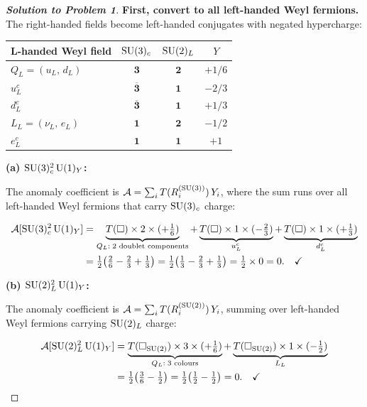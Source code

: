\documentclass[11pt,a4paper]{article}
\begin{document}
\begin{proof}[\textbf{Solution to Problem 1}]

\textbf{First, convert to all left-handed Weyl fermions.}  The right-handed
fields become left-handed conjugates with negated hypercharge:

\begin{center}
\renewcommand{\arraystretch}{1.3}
\begin{tabular}{@{}l c c c@{}}
\toprule
\textbf{L-handed Weyl field} & $\mathrm{SU}(3)_c$ & $\mathrm{SU}(2)_L$ & $Y$ \\
\midrule
$Q_L = (u_L,\, d_L)$ & $\mathbf{3}$ & $\mathbf{2}$ & $+1/6$ \\
$u_L^c$ & $\overline{\mathbf{3}}$ & $\mathbf{1}$ & $-2/3$ \\
$d_L^c$ & $\overline{\mathbf{3}}$ & $\mathbf{1}$ & $+1/3$ \\
$L_L = (\nu_L,\, e_L)$ & $\mathbf{1}$ & $\mathbf{2}$ & $-1/2$ \\
$e_L^c$ & $\mathbf{1}$ & $\mathbf{1}$ & $+1$ \\
\bottomrule
\end{tabular}
\end{center}

\textbf{(a) $\mathrm{SU}(3)_c^2\,\mathrm{U}(1)_Y$:}

The anomaly coefficient is $\mathcal{A} = \sum_i T(R_i^{(\mathrm{SU}(3))})\,Y_i$,
where the sum runs over all left-handed Weyl fermions that carry $\mathrm{SU}(3)_c$
charge:

\begin{align}
  \mathcal{A}[\mathrm{SU}(3)_c^2\,\mathrm{U}(1)_Y]
  &= \underbrace{T(\square) \times 2 \times (+\tfrac{1}{6})}_{Q_L:\;\text{2 doublet components}}
   + \underbrace{T(\square) \times 1 \times (-\tfrac{2}{3})}_{u_L^c}
   + \underbrace{T(\square) \times 1 \times (+\tfrac{1}{3})}_{d_L^c} \nonumber \\
  &= \tfrac{1}{2}\bigl(\tfrac{2}{6} - \tfrac{2}{3} + \tfrac{1}{3}\bigr)
   = \tfrac{1}{2}\bigl(\tfrac{1}{3} - \tfrac{2}{3} + \tfrac{1}{3}\bigr)
   = \tfrac{1}{2} \times 0 = 0. \quad\checkmark
\end{align}

\textbf{(b) $\mathrm{SU}(2)_L^2\,\mathrm{U}(1)_Y$:}

The anomaly coefficient is $\mathcal{A} = \sum_i T(R_i^{(\mathrm{SU}(2))})\,Y_i$,
summing over left-handed Weyl fermions carrying $\mathrm{SU}(2)_L$ charge:

\begin{align}
  \mathcal{A}[\mathrm{SU}(2)_L^2\,\mathrm{U}(1)_Y]
  &= \underbrace{T(\square_{\mathrm{SU}(2)}) \times 3 \times (+\tfrac{1}{6})}_{Q_L:\;\text{3 colours}}
   + \underbrace{T(\square_{\mathrm{SU}(2)}) \times 1 \times (-\tfrac{1}{2})}_{L_L} \nonumber \\
  &= \tfrac{1}{2}\bigl(\tfrac{3}{6} - \tfrac{1}{2}\bigr)
   = \tfrac{1}{2}\bigl(\tfrac{1}{2} - \tfrac{1}{2}\bigr)
   = 0. \quad\checkmark
\end{align}


\end{proof}
\end{document}

